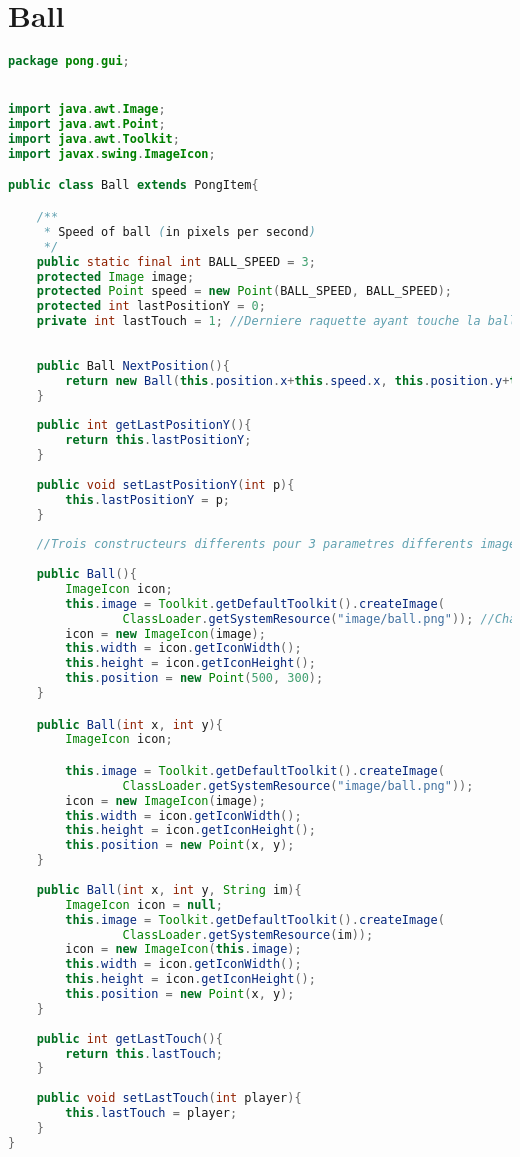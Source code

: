\section{Ball}
\begin{lstlisting}[language=Java]
package pong.gui;


import java.awt.Image;
import java.awt.Point;
import java.awt.Toolkit;
import javax.swing.ImageIcon;

public class Ball extends PongItem{

	/**
	 * Speed of ball (in pixels per second)
	 */
	public static final int BALL_SPEED = 3;
	protected Image image;
	protected Point speed = new Point(BALL_SPEED, BALL_SPEED);
	protected int lastPositionY = 0;
	private int lastTouch = 1; //Derniere raquette ayant touche la balle
	
	
	public Ball NextPosition(){
		return new Ball(this.position.x+this.speed.x, this.position.y+this.speed.y);
	}
	
	public int getLastPositionY(){
		return this.lastPositionY;
	}
	
	public void setLastPositionY(int p){
		this.lastPositionY = p;
	}
	
	//Trois constructeurs differents pour 3 parametres differents image et position (x, y) 
	
	public Ball(){
		ImageIcon icon;
		this.image = Toolkit.getDefaultToolkit().createImage( 
				ClassLoader.getSystemResource("image/ball.png")); //Chargement d'image
		icon = new ImageIcon(image);
		this.width = icon.getIconWidth();
		this.height = icon.getIconHeight();
		this.position = new Point(500, 300);
	}

	public Ball(int x, int y){
		ImageIcon icon;

		this.image = Toolkit.getDefaultToolkit().createImage(
				ClassLoader.getSystemResource("image/ball.png"));
		icon = new ImageIcon(image);
		this.width = icon.getIconWidth();
		this.height = icon.getIconHeight();
		this.position = new Point(x, y);
	}
	
	public Ball(int x, int y, String im){
		ImageIcon icon = null;
		this.image = Toolkit.getDefaultToolkit().createImage(
				ClassLoader.getSystemResource(im));
		icon = new ImageIcon(this.image);
		this.width = icon.getIconWidth();
		this.height = icon.getIconHeight();
		this.position = new Point(x, y);
	}
	
	public int getLastTouch(){
		return this.lastTouch;
	}
	
	public void setLastTouch(int player){
		this.lastTouch = player;
	}
}
\end{lstlisting}